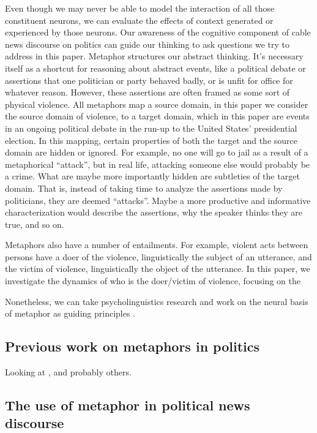 Even though we may never be able to model the interaction of all those 
constituent neurons, we can evaluate the effects of context generated or 
experienced by those neurons. Our awareness of the cognitive component of 
cable news discourse on politics can guide our thinking to ask questions we
try to address in this paper. Metaphor structures our abstract thinking. It's
necessary itself as a shortcut for reasoning about abstract events, like a
political debate or assertions that one politician or party behaved badly, or
is unfit for office for whatever reason. However, these assertions are often
framed as some sort of physical violence. All metaphors map a source domain,
in this paper we consider the source domain of violence, to a target domain,
which in this paper are events in an ongoing political debate in the run-up to
the United States' presidential election. In this mapping, certain properties
of both the target and the source domain are hidden or ignored. For example,
no one will go to jail as a result of a metaphorical ``attack'', but in real
life, attacking someone else would probably be a crime. What are maybe more 
importantly hidden are subtleties of the target domain. That is, instead of
taking time to analyze the assertions made by politicians, they are deemed
``attacks''. Maybe a more productive and informative characterization would
describe the assertions, why the speaker thinks they are true, and so on.

Metaphors also have a number of entailments. For example, violent acts between
persons have a doer of the violence, linguistically the subject of an 
utterance, and the victim of violence, linguistically the object of the
utterance. In this paper, we investigate the dynamics of who is the doer/victim 
of violence, focusing on the 

Nonetheless, we can take psycholinguistics research and work on the neural basis
of metaphor as guiding principles \cite{Gallese2005}. 


\subsection{Previous work on metaphors in politics}
\label{sub:Previous-work-on-metaphors-in-politics}

Looking at \cite{Matlock2012, Matlock2013, Lakoff2008, Lakoff2012}, and probably others.


\subsection{The use of metaphor in political news discourse}
\label{sub:The-use-of-metaphor-in-political-news-discourse}

